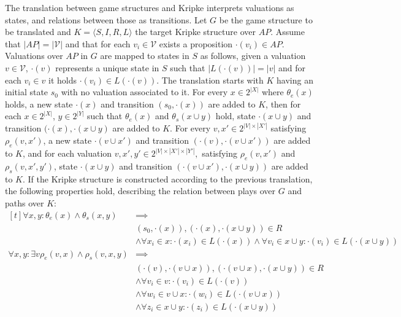 The translation between game structures and Kripke interprets valuations as states, and relations between those as transitions. Let $G$ be the game structure to be translated and $K=\langle S, I, R, L \rangle$ the target Kripke structure over $AP$. 
Assume that $|AP|=|\mathcal{V}|$ and that for each $v_i \in \mathcal{V}$ exists a proposition $\cdot(v_i) \in AP$. Valuations over $AP$ in $G$ are mapped to states in $S$ as follows, given a valuation $v \in \mathcal{V}$, $\cdot(v)$ represents a unique state in $S$ such that  $|L(\cdot(v))| = |v|$ and for each $v_i \in v$ it holds $\cdot(v_i) \in L(\cdot(v))$. The translation starts with $K$ having an initial state $s_0$ with no valuation associated to it. For every $x \in 2^{|X|}$ where $\theta_e(x)$ holds, a new state $\cdot(x)$ and transition $(s_0, \cdot(x))$ are added to $K$, then for each $x \in 2^{|X|}$, $y \in 2^{|Y|}$ such that $\theta_e(x)$ and $\theta_s(x \cup y)$ hold, state $\cdot(x \cup y)$ and transition $(\cdot(x), \cdot(x \cup y)$ are added to $K$.  For every $v,x' \in 2^{|V|\times|X'|}$ satisfying $\rho_e(v,x')$, a new state $\cdot(v \cup x')$ and transition $(\cdot(v), \cdot(v\cup x'))$ are added to $K$, and for each valuation $v,x',y' \in 2^{|V|\times|X'|\times|Y'|}, $ satisfying $\rho_e(v, x')$ and $\rho_s(v,x',y')$, state $\cdot(x \cup y)$ and transition $(\cdot(v \cup x'), \cdot(x \cup y))$ are added to $K$. 
If the Kripke structure is constructed according to the previous translation, the following properties hold, describing the relation between plays over $G$ and paths over $K$:
	\[\begin{aligned}[t]
	\forall x, y: \theta_e(x) \wedge \theta_s(x,y)& \implies\\
	&(s_0, \cdot (x)), (\cdot(x), \cdot (x \cup y)) \in R \\
	&\wedge \forall x_i \in x: \cdot(x_i) \in L(\cdot(x)) \wedge \forall v_i \in x \cup y : \cdot(v_i) \in L(\cdot(x \cup y))\\
	\forall x, y : \exists v \rho_e(v,x) \wedge \rho_s(v,x,y)& \implies\\
	&(\cdot(v), \cdot(v \cup x)), (\cdot(v \cup x),\cdot(x \cup y)) \in R\\
	&\wedge \forall v_i \in v: \cdot(v_i) \in L(\cdot(v)) \\
	&\wedge \forall w_i \in v \cup x: \cdot(w_i) \in L(\cdot(v \cup x))\\
	&\wedge \forall z_i \in x \cup y: \cdot(z_i) \in L(\cdot(x \cup y))	
	\end{aligned}
	\] 

